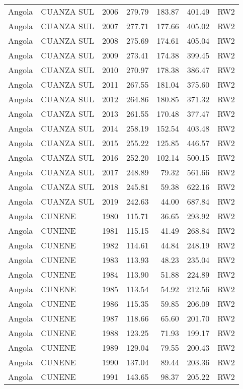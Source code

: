 \begin{longtable}{lllrrrl}
  Angola & CUANZA SUL & 2006 & 279.79 & 183.87 & 401.49 & RW2 \\ 
  Angola & CUANZA SUL & 2007 & 277.71 & 177.66 & 405.02 & RW2 \\ 
  Angola & CUANZA SUL & 2008 & 275.69 & 174.61 & 405.04 & RW2 \\ 
  Angola & CUANZA SUL & 2009 & 273.41 & 174.38 & 399.45 & RW2 \\ 
  Angola & CUANZA SUL & 2010 & 270.97 & 178.38 & 386.47 & RW2 \\ 
  Angola & CUANZA SUL & 2011 & 267.55 & 181.04 & 375.60 & RW2 \\ 
  Angola & CUANZA SUL & 2012 & 264.86 & 180.85 & 371.32 & RW2 \\ 
  Angola & CUANZA SUL & 2013 & 261.55 & 170.48 & 377.47 & RW2 \\ 
  Angola & CUANZA SUL & 2014 & 258.19 & 152.54 & 403.48 & RW2 \\ 
  Angola & CUANZA SUL & 2015 & 255.22 & 125.85 & 446.57 & RW2 \\ 
  Angola & CUANZA SUL & 2016 & 252.20 & 102.14 & 500.15 & RW2 \\ 
  Angola & CUANZA SUL & 2017 & 248.89 & 79.32 & 561.66 & RW2 \\ 
  Angola & CUANZA SUL & 2018 & 245.81 & 59.38 & 622.16 & RW2 \\ 
  Angola & CUANZA SUL & 2019 & 242.63 & 44.00 & 687.84 & RW2 \\ 
  Angola & CUNENE & 1980 & 115.71 & 36.65 & 293.92 & RW2 \\ 
  Angola & CUNENE & 1981 & 115.15 & 41.49 & 268.84 & RW2 \\ 
  Angola & CUNENE & 1982 & 114.61 & 44.84 & 248.19 & RW2 \\ 
  Angola & CUNENE & 1983 & 113.93 & 48.23 & 235.04 & RW2 \\ 
  Angola & CUNENE & 1984 & 113.90 & 51.88 & 224.89 & RW2 \\ 
  Angola & CUNENE & 1985 & 113.54 & 54.92 & 212.56 & RW2 \\ 
  Angola & CUNENE & 1986 & 115.35 & 59.85 & 206.09 & RW2 \\ 
  Angola & CUNENE & 1987 & 118.66 & 65.60 & 201.70 & RW2 \\ 
  Angola & CUNENE & 1988 & 123.25 & 71.93 & 199.17 & RW2 \\ 
  Angola & CUNENE & 1989 & 129.04 & 79.55 & 200.43 & RW2 \\ 
  Angola & CUNENE & 1990 & 137.04 & 89.44 & 203.36 & RW2 \\ 
  Angola & CUNENE & 1991 & 143.65 & 98.37 & 205.22 & RW2 \\ 

\end{longtable}

